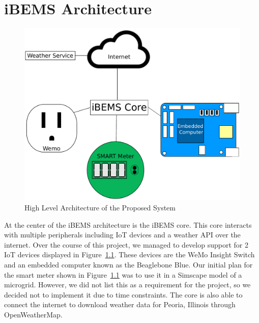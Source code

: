 \chapter{iBEMS Architecture}
\label{ch: Chapter2}

\begin{figure}[H]
    \centering
    \includegraphics[scale=0.8]{figs/highLevelArchitecture.pdf}
    \caption{High Level Architecture of the Proposed System}
    \label{fig:highLevelArchitecture}
\end{figure}

At the center of the iBEMS architecture is the iBEMS core. This core interacts with multiple peripherals including IoT devices and a weather API over the internet. Over the course of this project, we managed to develop support for 2 IoT devices displayed in Figure~\ref{fig:highLevelArchitecture}. These devices are the WeMo Insight Switch and an embedded computer known as the Beaglebone Blue. Our initial plan for the smart meter shown in Figure~\ref{fig:highLevelArchitecture} was to use it in a Simscape model of a microgrid. However, we did not list this as a requirement for the project, so we decided not to implement it due to time constraints. The core is also able to connect the internet to download weather data for Peoria, Illinois through OpenWeatherMap.

